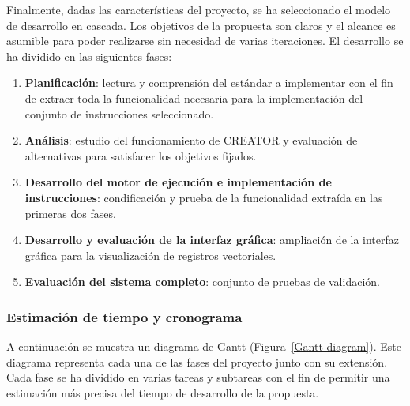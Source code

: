 Finalmente, dadas las características del proyecto, se ha seleccionado el modelo de desarrollo en cascada. Los objetivos de la propuesta son claros y el alcance es asumible para poder realizarse sin necesidad de varias iteraciones. El desarrollo se ha dividido en las siguientes fases:
\begin{enumerate}
    \item \textbf{Planificación}: lectura y comprensión del estándar a implementar con el fin de extraer toda la funcionalidad necesaria para la implementación del conjunto de instrucciones seleccionado.
    \item \textbf{Análisis}: estudio del funcionamiento de CREATOR y evaluación de alternativas para satisfacer los objetivos fijados.
    \item \textbf{Desarrollo del motor de ejecución e implementación de instrucciones}: condificación y prueba de la funcionalidad extraída en las primeras dos fases.
    \item \textbf{Desarrollo y evaluación de la interfaz gráfica}: ampliación de la interfaz gráfica para la visualización de registros vectoriales.
    \item \textbf{Evaluación del sistema completo}: conjunto de pruebas de validación.
\end{enumerate}

\subsubsection{Estimación de tiempo y cronograma}\label{subsec:Gantt-diagram}
A continuación se muestra un diagrama de Gantt (Figura~\ref{Gantt-diagram}). Este diagrama representa cada una de las fases del proyecto junto con su extensión. Cada fase se ha dividido en varias tareas y subtareas con el fin de permitir una estimación más precisa del tiempo de desarrollo de la propuesta.

